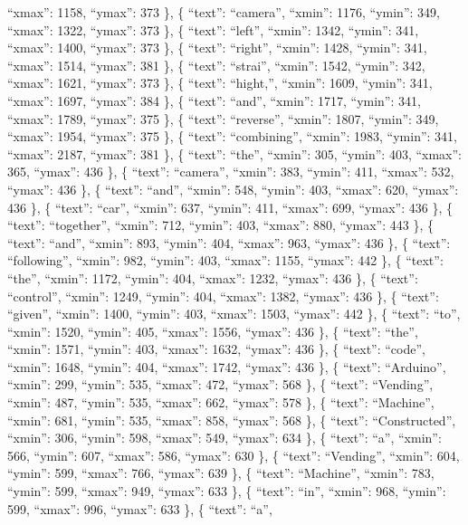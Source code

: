 \documentclass[
]{article}
\begin{document}
``xmax'': 1158, ``ymax'': 373 \}, \{ ``text'': ``camera'', ``xmin'':
1176, ``ymin'': 349, ``xmax'': 1322, ``ymax'': 373 \}, \{ ``text'':
``left'', ``xmin'': 1342, ``ymin'': 341, ``xmax'': 1400, ``ymax'': 373
\}, \{ ``text'': ``right'', ``xmin'': 1428, ``ymin'': 341, ``xmax'':
1514, ``ymax'': 381 \}, \{ ``text'': ``strai'', ``xmin'': 1542,
``ymin'': 342, ``xmax'': 1621, ``ymax'': 373 \}, \{ ``text'':
``hight,'', ``xmin'': 1609, ``ymin'': 341, ``xmax'': 1697, ``ymax'': 384
\}, \{ ``text'': ``and'', ``xmin'': 1717, ``ymin'': 341, ``xmax'': 1789,
``ymax'': 375 \}, \{ ``text'': ``reverse'', ``xmin'': 1807, ``ymin'':
349, ``xmax'': 1954, ``ymax'': 375 \}, \{ ``text'': ``combining'',
``xmin'': 1983, ``ymin'': 341, ``xmax'': 2187, ``ymax'': 381 \}, \{
``text'': ``the'', ``xmin'': 305, ``ymin'': 403, ``xmax'': 365,
``ymax'': 436 \}, \{ ``text'': ``camera'', ``xmin'': 383, ``ymin'': 411,
``xmax'': 532, ``ymax'': 436 \}, \{ ``text'': ``and'', ``xmin'': 548,
``ymin'': 403, ``xmax'': 620, ``ymax'': 436 \}, \{ ``text'': ``car'',
``xmin'': 637, ``ymin'': 411, ``xmax'': 699, ``ymax'': 436 \}, \{
``text'': ``together'', ``xmin'': 712, ``ymin'': 403, ``xmax'': 880,
``ymax'': 443 \}, \{ ``text'': ``and'', ``xmin'': 893, ``ymin'': 404,
``xmax'': 963, ``ymax'': 436 \}, \{ ``text'': ``following'', ``xmin'':
982, ``ymin'': 403, ``xmax'': 1155, ``ymax'': 442 \}, \{ ``text'':
``the'', ``xmin'': 1172, ``ymin'': 404, ``xmax'': 1232, ``ymax'': 436
\}, \{ ``text'': ``control'', ``xmin'': 1249, ``ymin'': 404, ``xmax'':
1382, ``ymax'': 436 \}, \{ ``text'': ``given'', ``xmin'': 1400,
``ymin'': 403, ``xmax'': 1503, ``ymax'': 442 \}, \{ ``text'': ``to'',
``xmin'': 1520, ``ymin'': 405, ``xmax'': 1556, ``ymax'': 436 \}, \{
``text'': ``the'', ``xmin'': 1571, ``ymin'': 403, ``xmax'': 1632,
``ymax'': 436 \}, \{ ``text'': ``code'', ``xmin'': 1648, ``ymin'': 404,
``xmax'': 1742, ``ymax'': 436 \}, \{ ``text'': ``Arduino'', ``xmin'':
299, ``ymin'': 535, ``xmax'': 472, ``ymax'': 568 \}, \{ ``text'':
``Vending'', ``xmin'': 487, ``ymin'': 535, ``xmax'': 662, ``ymax'': 578
\}, \{ ``text'': ``Machine'', ``xmin'': 681, ``ymin'': 535, ``xmax'':
858, ``ymax'': 568 \}, \{ ``text'': ``Constructed'', ``xmin'': 306,
``ymin'': 598, ``xmax'': 549, ``ymax'': 634 \}, \{ ``text'': ``a'',
``xmin'': 566, ``ymin'': 607, ``xmax'': 586, ``ymax'': 630 \}, \{
``text'': ``Vending'', ``xmin'': 604, ``ymin'': 599, ``xmax'': 766,
``ymax'': 639 \}, \{ ``text'': ``Machine'', ``xmin'': 783, ``ymin'':
599, ``xmax'': 949, ``ymax'': 633 \}, \{ ``text'': ``in'', ``xmin'':
968, ``ymin'': 599, ``xmax'': 996, ``ymax'': 633 \}, \{ ``text'': ``a'',
\end{document}
